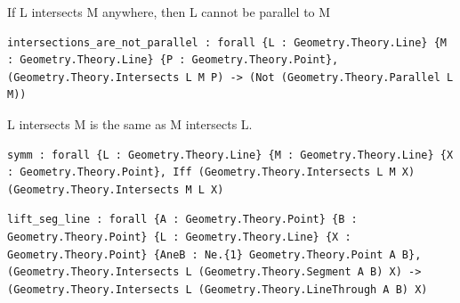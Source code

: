 
\begin{theorem}
  \label{Geometry.Theory.Intersection.intersections_are_not_parallel}
  \leanok
  If L intersects M anywhere, then L cannot be parallel to M 
\begin{verbatim}intersections_are_not_parallel : forall {L : Geometry.Theory.Line} {M : Geometry.Theory.Line} {P : Geometry.Theory.Point}, (Geometry.Theory.Intersects L M P) -> (Not (Geometry.Theory.Parallel L M))\end{verbatim}
\end{theorem}

\begin{theorem}
  \label{Geometry.Theory.Intersection.symm}
  \leanok
  L intersects M is the same as M intersects L. 
\begin{verbatim}symm : forall {L : Geometry.Theory.Line} {M : Geometry.Theory.Line} {X : Geometry.Theory.Point}, Iff (Geometry.Theory.Intersects L M X) (Geometry.Theory.Intersects M L X)\end{verbatim}
\end{theorem}

\begin{theorem}
  \label{Geometry.Theory.Intersection.lift_seg_line}
  \leanok
\begin{verbatim}lift_seg_line : forall {A : Geometry.Theory.Point} {B : Geometry.Theory.Point} {L : Geometry.Theory.Line} {X : Geometry.Theory.Point} {AneB : Ne.{1} Geometry.Theory.Point A B}, (Geometry.Theory.Intersects L (Geometry.Theory.Segment A B) X) -> (Geometry.Theory.Intersects L (Geometry.Theory.LineThrough A B) X)\end{verbatim}
\end{theorem}

